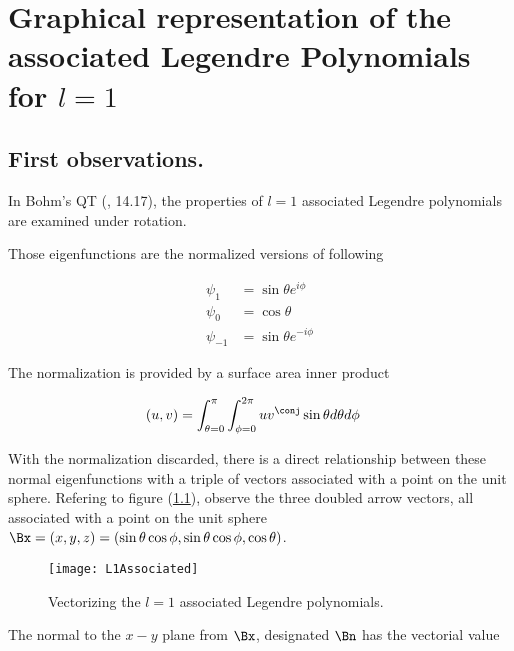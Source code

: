

\chapter{Graphical representation of the associated Legendre Polynomials for $l=1$}
\label{chap:L1Associated}
{}
\date{Aug 16, 2009}

\beginArtNoToc

\section{First observations.}

In Bohm's QT (\cite{bohm1989qt}, 14.17), the properties of $l=1$ associated Legendre polynomials are examined under rotation.

Those eigenfunctions are the normalized versions of following

\begin{align}\label{eqn:foo1}
\psi_1 &= \sin\theta e^{i\phi} \\
\psi_0 &= \cos\theta \\
\psi_{-1} &= \sin\theta e^{-i\phi}
\end{align}

The normalization is provided by a surface area inner product

\begin{align}\label{eqn:foo2}
(u,v) &= \int_{\theta=0}^{\pi} \int_{\phi=0}^{2\pi} u v^\conj \sin\theta d\theta d\phi
\end{align}

With the normalization discarded, there is a direct relationship between these normal eigenfunctions with a triple of vectors associated with a point on the unit sphere.  Refering to figure (\ref{fig:L1Associated}), observe the three doubled arrow vectors, all associated with a point on the unit sphere $\Bx = (x,y,z) = (\sin\theta \cos\phi, \sin\theta \cos\phi, \cos\theta)$.  

\begin{figure}[htp]
\centering
\texttt{[image: L1Associated]}
\caption{Vectorizing the $l=1$ associated Legendre polynomials.}\label{fig:L1Associated}
\end{figure}

The normal to the $x-y$ plane from $\Bx$, designated $\Bn$ has the vectorial value


